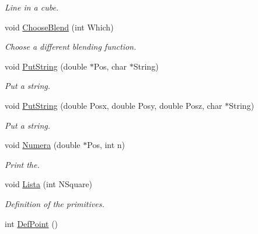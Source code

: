 \begin{DoxyCompactItemize}
\begin{DoxyCompactList}\small\item\em Line in a cube. \end{DoxyCompactList}\item 
void \hyperlink{classDraw_affbc65c5c21480f96c44a3a007eab346}{Choose\+Blend} (int Which)\hypertarget{classDraw_affbc65c5c21480f96c44a3a007eab346}{}\label{classDraw_affbc65c5c21480f96c44a3a007eab346}

\begin{DoxyCompactList}\small\item\em Choose a different blending function. \end{DoxyCompactList}\item 
void \hyperlink{classDraw_a54d1e606bdbeb32edce52a58531b9a1c}{Put\+String} (double $\ast$Pos, char $\ast$String)\hypertarget{classDraw_a54d1e606bdbeb32edce52a58531b9a1c}{}\label{classDraw_a54d1e606bdbeb32edce52a58531b9a1c}

\begin{DoxyCompactList}\small\item\em Put a string. \end{DoxyCompactList}\item 
void \hyperlink{classDraw_af8297bf0b592efa35fb5b8e62ecf9c29}{Put\+String} (double Posx, double Posy, double Posz, char $\ast$String)\hypertarget{classDraw_af8297bf0b592efa35fb5b8e62ecf9c29}{}\label{classDraw_af8297bf0b592efa35fb5b8e62ecf9c29}

\begin{DoxyCompactList}\small\item\em Put a string. \end{DoxyCompactList}\item 
void \hyperlink{classDraw_a7a0fab2975ffd1787c0d9168f5a8574c}{Numera} (double $\ast$Pos, int n)
\begin{DoxyCompactList}\small\item\em Print the. \end{DoxyCompactList}\item 
void \hyperlink{classDraw_ac5e4238325fb9dde3862a6f1053b5e8d}{Lista} (int N\+Square)\hypertarget{classDraw_ac5e4238325fb9dde3862a6f1053b5e8d}{}\label{classDraw_ac5e4238325fb9dde3862a6f1053b5e8d}

\begin{DoxyCompactList}\small\item\em Definition of the primitives. \end{DoxyCompactList}\item 
int \hyperlink{classDraw_a318bab761ab1ad340c3a7d2d17df4f9b}{Def\+Point} ()\hypertarget{classDraw_a318bab761ab1ad340c3a7d2d17df4f9b}{}\label{classDraw_a318bab761ab1ad340c3a7d2d17df4f9b}


\end{DoxyCompactItemize}

